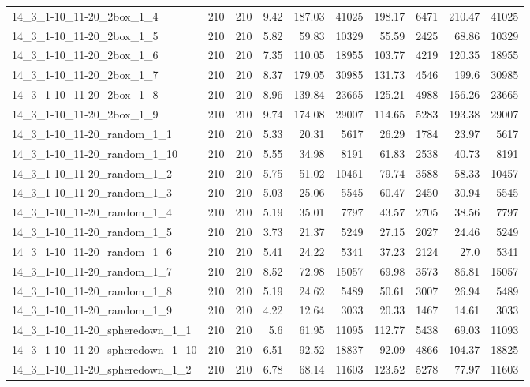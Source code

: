 \begin{center}
\begin{scriptsize}
\begin{longtable}{lrrrrrrrrr}
14\_3\_1-10\_11-20\_2box\_1\_4 & 210 & 210 & 9.42 & 187.03 & 41025 & 198.17 & 6471 & 210.47 & 41025\\
14\_3\_1-10\_11-20\_2box\_1\_5 & 210 & 210 & 5.82 & 59.83 & 10329 & 55.59 & 2425 & 68.86 & 10329\\
14\_3\_1-10\_11-20\_2box\_1\_6 & 210 & 210 & 7.35 & 110.05 & 18955 & 103.77 & 4219 & 120.35 & 18955\\
14\_3\_1-10\_11-20\_2box\_1\_7 & 210 & 210 & 8.37 & 179.05 & 30985 & 131.73 & 4546 & 199.6 & 30985\\
14\_3\_1-10\_11-20\_2box\_1\_8 & 210 & 210 & 8.96 & 139.84 & 23665 & 125.21 & 4988 & 156.26 & 23665\\
14\_3\_1-10\_11-20\_2box\_1\_9 & 210 & 210 & 9.74 & 174.08 & 29007 & 114.65 & 5283 & 193.38 & 29007\\
14\_3\_1-10\_11-20\_random\_1\_1 & 210 & 210 & 5.33 & 20.31 & 5617 & 26.29 & 1784 & 23.97 & 5617\\
14\_3\_1-10\_11-20\_random\_1\_10 & 210 & 210 & 5.55 & 34.98 & 8191 & 61.83 & 2538 & 40.73 & 8191\\
14\_3\_1-10\_11-20\_random\_1\_2 & 210 & 210 & 5.75 & 51.02 & 10461 & 79.74 & 3588 & 58.33 & 10457\\
14\_3\_1-10\_11-20\_random\_1\_3 & 210 & 210 & 5.03 & 25.06 & 5545 & 60.47 & 2450 & 30.94 & 5545\\
14\_3\_1-10\_11-20\_random\_1\_4 & 210 & 210 & 5.19 & 35.01 & 7797 & 43.57 & 2705 & 38.56 & 7797\\
14\_3\_1-10\_11-20\_random\_1\_5 & 210 & 210 & 3.73 & 21.37 & 5249 & 27.15 & 2027 & 24.46 & 5249\\
14\_3\_1-10\_11-20\_random\_1\_6 & 210 & 210 & 5.41 & 24.22 & 5341 & 37.23 & 2124 & 27.0 & 5341\\
14\_3\_1-10\_11-20\_random\_1\_7 & 210 & 210 & 8.52 & 72.98 & 15057 & 69.98 & 3573 & 86.81 & 15057\\
14\_3\_1-10\_11-20\_random\_1\_8 & 210 & 210 & 5.19 & 24.62 & 5489 & 50.61 & 3007 & 26.94 & 5489\\
14\_3\_1-10\_11-20\_random\_1\_9 & 210 & 210 & 4.22 & 12.64 & 3033 & 20.33 & 1467 & 14.61 & 3033\\
14\_3\_1-10\_11-20\_spheredown\_1\_1 & 210 & 210 & 5.6 & 61.95 & 11095 & 112.77 & 5438 & 69.03 & 11093\\
14\_3\_1-10\_11-20\_spheredown\_1\_10 & 210 & 210 & 6.51 & 92.52 & 18837 & 92.09 & 4866 & 104.37 & 18825\\
14\_3\_1-10\_11-20\_spheredown\_1\_2 & 210 & 210 & 6.78 & 68.14 & 11603 & 123.52 & 5278 & 77.97 & 11603\\

\end{longtable}
\end{scriptsize}
\end{center}
